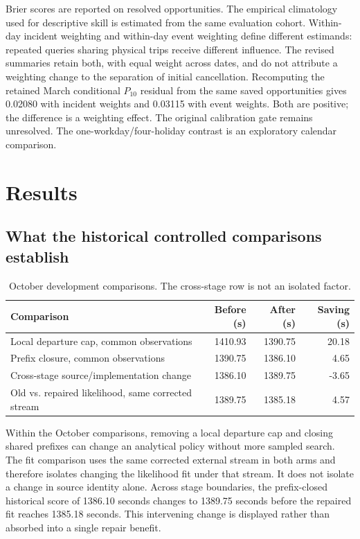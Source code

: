 \documentclass[preprint,12pt,authoryear]{elsarticle}
\begin{document}
Brier scores are reported on resolved opportunities. The empirical climatology
used for descriptive skill is estimated from the same evaluation cohort.
Within-day incident weighting and within-day event weighting define different
estimands: repeated queries sharing physical trips receive different influence.
The revised summaries retain both, with equal weight across dates, and do not
attribute a weighting change to the separation of initial cancellation.
Recomputing the retained March conditional $P_{10}$ residual from the same saved opportunities gives 0.02080 with incident weights and 0.03115 with event weights. Both are positive; the difference is a weighting effect. The original calibration gate remains unresolved.
The one-workday/four-holiday contrast is an exploratory calendar comparison.

\section{Results}
\subsection{What the historical controlled comparisons establish}
\begin{table}[ht]
\centering\small\setlength{\tabcolsep}{4pt}
\caption{October development comparisons. The cross-stage row is not an isolated factor.}
\begin{tabular}{p{}rrr}
\toprule
Comparison & Before (s) & After (s) & Saving (s) \\
\midrule
Local departure cap, common observations & 1410.93 & 1390.75 & 20.18 \\
Prefix closure, common observations & 1390.75 & 1386.10 & 4.65 \\
Cross-stage source/implementation change & 1386.10 & 1389.75 & -3.65 \\
Old vs. repaired likelihood, same corrected stream & 1389.75 & 1385.18 & 4.57 \\
\bottomrule
\end{tabular}
\end{table}

Within the October comparisons, removing a local departure cap and closing
shared prefixes can change an analytical policy without more sampled search.
The fit comparison uses the same corrected external stream in both arms and
therefore isolates changing the likelihood fit under that stream. It does not
isolate a change in source identity alone. Across stage boundaries, the
prefix-closed historical score of 1386.10 seconds changes to 1389.75
seconds before the repaired fit reaches 1385.18 seconds. This intervening
change is displayed rather than absorbed into a single repair benefit.
\end{document}
